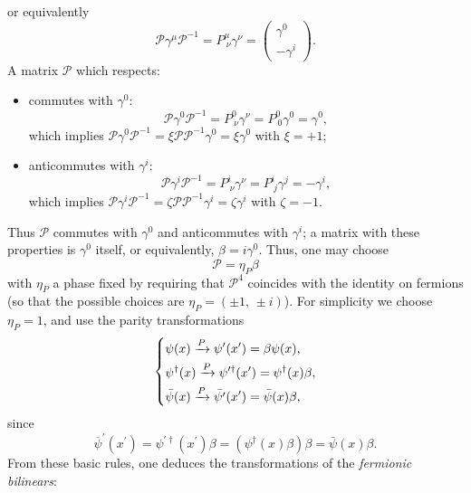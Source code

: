 or equivalently
\[
    \mathcal{P} \gamma^{\mu} \mathcal{P}^{-1} = P_{\ \nu}^{\mu} \gamma^{\nu} = \begin{pmatrix}
        \gamma^0 \\
        - \gamma^i
    \end{pmatrix}.
\]
A matrix \(\mathcal{P}\) which respects:
\begin{itemize}
    \item[(\(\mu=0\))] commutes with \(\gamma^0\):
          \[
              \mathcal{P} \gamma^0 \mathcal{P}^{-1} = P^{0}_{\ \nu} \gamma^{\nu} =P^0_{\ 0}\gamma^0 = \gamma^0,
          \]
          which implies \(\mathcal{P} \gamma^0 \mathcal{P}^{-1} = \xi \mathcal{P} \mathcal{P}^{-1} \gamma^0 = \xi \gamma^0\) with \(\xi = +1\);
    \item[(\(\mu=i\))] anticommutes with \(\gamma^i\):
          \[
              \mathcal{P} \gamma^i \mathcal{P}^{-1} = P^{i}_{\ \nu} \gamma^{\nu} = P^{i}_{\ j} \gamma^{j} = - \gamma^i,
          \]
          which implies \(\mathcal{P} \gamma^i \mathcal{P}^{-1} = \zeta \mathcal{P} \mathcal{P}^{-1} \gamma^i = \zeta \gamma^i\) with \(\zeta = -1\).
\end{itemize}
Thus \(\mathcal{P}\) commutes with \(\gamma^0\) and anticommutes with \(\gamma^i\); a matrix with these properties is \(\gamma^0\) itself, or equivalently, \(\beta = i \gamma^0\). Thus, one may choose
\[
    \mathcal{P} = \eta_P \beta
\]
with \(\eta_P\) a phase fixed by requiring that \(\mathcal{P}^4\) coincides with the identity on fermions (so that the possible choices are \(\eta_P = (\pm 1,\,\pm i)\)). For simplicity we choose \(\eta_P=1\), and use the parity transformations
\[
    \begin{dcases}
        \psi(x)            \xrightarrow{P} \psi^{\prime}(x^{\prime}) = \beta \psi(x),                   \\
        \psi^{\dagger}(x)  \xrightarrow{P} \psi^{\prime \dagger}(x^{\prime}) = \psi^{\dagger}(x) \beta, \\
        \bar{\psi}(x)      \xrightarrow{P} \bar{\psi^{\prime}}(x^{\prime}) = \bar{\psi}(x) \beta,
    \end{dcases}
\]
since
\[
    \overline{\psi}^{\prime}(x^{\prime}) = \psi^{\prime \dagger}(x^{\prime}) \beta = (\psi^{\dagger}(x) \beta) \beta = \bar{\psi}(x) \beta.
\]
From these basic rules, one deduces the transformations of the \textit{fermionic bilinears}:
